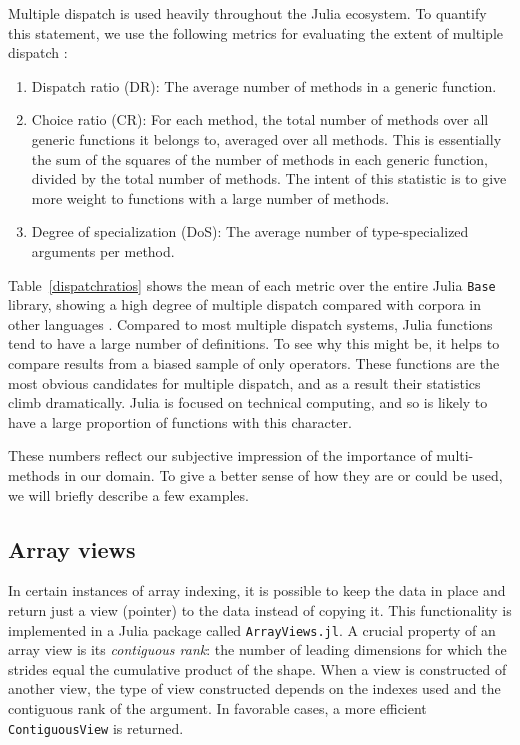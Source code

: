\documentclass[preprint]{sigplanconf}
\newcommand{\code}[1]{\texttt{#1}}
\begin{document}
Multiple dispatch is used heavily throughout the Julia ecosystem. To quantify
this statement, we use the following metrics for evaluating the extent of 
multiple dispatch \cite{Muschevici:2008}:

\begin{enumerate}
\item Dispatch ratio (DR): The average number of methods in a generic function.
\item Choice ratio (CR): For each method, the total number of methods over all
generic functions it belongs to, averaged over all methods. This is essentially
the sum of the squares of the number of methods in each generic function, divided
by the total number of methods. The intent of this statistic is to give more weight
to functions with a large number of methods.
\item Degree of specialization (DoS): The average number of type-specialized
arguments per method.
\end{enumerate}

Table~\ref{dispatchratios} shows the mean of each metric over the entire Julia
\code{Base} library, showing a high degree of multiple dispatch compared with
corpora in other languages \cite{Muschevici:2008}.
Compared to most multiple dispatch systems, Julia functions tend to have a large
number of definitions. To see why this might be, it helps to compare results
from a biased sample of only operators. These functions are the most obvious
candidates for multiple dispatch, and as a result their statistics climb
dramatically. Julia is focused on technical computing, and so is likely to
have a large proportion of functions with this character.

These numbers reflect our subjective impression of the importance of
multi-methods in our domain. To give a better sense of how they
are or could be used, we will briefly describe a few examples.

\subsection{Array views}

In certain instances of array indexing, it is
possible to keep the data in place and return just a view (pointer) to the
data instead of copying it. This functionality is implemented in a Julia
package called \code{ArrayViews.jl}\cite{Lin:2014av}. A crucial property
of an array view is its \emph{contiguous rank}: the number of leading
dimensions for which the strides equal the cumulative product of the shape.
When a view is constructed of another view, the type of view constructed
depends on the indexes used and the contiguous rank of the argument. In
favorable cases, a more efficient \code{ContiguousView} is returned.
\end{document}
